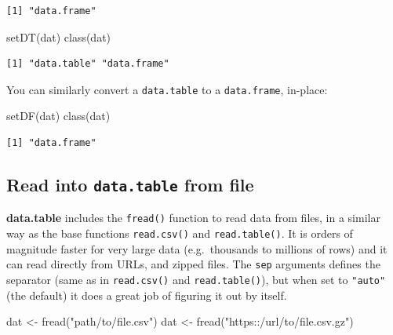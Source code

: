 \documentclass[
]{book}
\newenvironment{Shaded}{\begin{snugshade}}{\end{snugshade}}
\newcommand{\FunctionTok}[1]{\textcolor[rgb]{0.00,0.00,0.00}{#1}}
\newcommand{\NormalTok}[1]{#1}
\newcommand{\OtherTok}[1]{\textcolor[rgb]{0.56,0.35,0.01}{#1}}
\newcommand{\StringTok}[1]{\textcolor[rgb]{0.31,0.60,0.02}{#1}}
\begin{document}
\begin{verbatim}
[1] "data.frame"
\end{verbatim}

\begin{Shaded}
\begin{Highlighting}[]
\FunctionTok{setDT}\NormalTok{(dat)}
\FunctionTok{class}\NormalTok{(dat)}
\end{Highlighting}
\end{Shaded}

\begin{verbatim}
[1] "data.table" "data.frame"
\end{verbatim}

You can similarly convert a \texttt{data.table} to a \texttt{data.frame}, in-place:

\begin{Shaded}
\begin{Highlighting}[]
\FunctionTok{setDF}\NormalTok{(dat)}
\FunctionTok{class}\NormalTok{(dat)}
\end{Highlighting}
\end{Shaded}

\begin{verbatim}
[1] "data.frame"
\end{verbatim}

\hypertarget{read-into-data.table-from-file}{%
\subsection{\texorpdfstring{Read into \texttt{data.table} from file}{Read into data.table from file}}\label{read-into-data.table-from-file}}

\textbf{data.table} includes the \texttt{fread()} function to read data from files, in a similar way as the base functions \texttt{read.csv()} and \texttt{read.table()}. It is orders of magnitude faster for very large data (e.g.~thousands to millions of rows) and it can read directly from URLs, and zipped files. The \texttt{sep} arguments defines the separator (same as in \texttt{read.csv()} and \texttt{read.table()}), but when set to \texttt{"auto"} (the default) it does a great job of figuring it out by itself.

\begin{Shaded}
\begin{Highlighting}[]
\NormalTok{dat }\OtherTok{\textless{}{-}} \FunctionTok{fread}\NormalTok{(}\StringTok{"path/to/file.csv"}\NormalTok{)}
\NormalTok{dat }\OtherTok{\textless{}{-}} \FunctionTok{fread}\NormalTok{(}\StringTok{"https::/url/to/file.csv.gz"}\NormalTok{)}
\end{Highlighting}
\end{Shaded}
\end{document}

